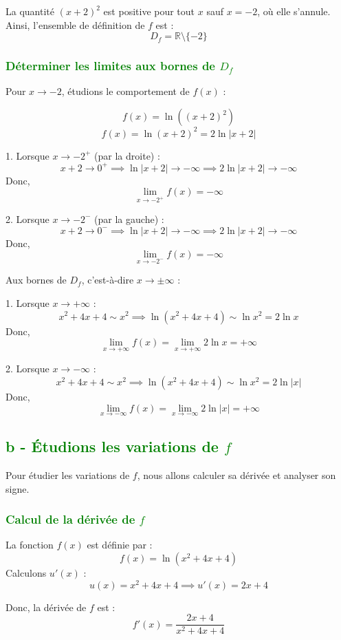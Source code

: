 \documentclass[12pt]{article}
\begin{document}
La quantité \((x + 2)^2\) est positive pour tout \( x \) sauf \( x = -2 \), où elle s'annule. Ainsi, l'ensemble de définition de \( f \) est :
\[
D_f = \mathbb{R} \setminus \{-2\}
\]

\subsubsection*{\textcolor{green}{Déterminer les limites aux bornes de \( D_f \)}}
Pour \( x \to -2 \), étudions le comportement de \( f(x) \) :

\[
f(x) = \ln((x + 2)^2)
\]
\[
f(x) = \ln(x + 2)^2 = 2 \ln|x + 2|
\]

1. Lorsque \( x \to -2^+ \) (par la droite) :
\[
x + 2 \to 0^+ \implies \ln|x + 2| \to -\infty \implies 2 \ln|x + 2| \to -\infty
\]
Donc,
\[
\lim_{x \to -2^+} f(x) = -\infty
\]

2. Lorsque \( x \to -2^- \) (par la gauche) :
\[
x + 2 \to 0^- \implies \ln|x + 2| \to -\infty \implies 2 \ln|x + 2| \to -\infty
\]
Donc,
\[
\lim_{x \to -2^-} f(x) = -\infty
\]

Aux bornes de \( D_f \), c'est-à-dire \( x \to \pm \infty \) :

1. Lorsque \( x \to +\infty \) :
\[
x^2 + 4x + 4 \sim x^2 \implies \ln(x^2 + 4x + 4) \sim \ln x^2 = 2 \ln x
\]
Donc,
\[
\lim_{x \to +\infty} f(x) = \lim_{x \to +\infty} 2 \ln x = +\infty
\]

2. Lorsque \( x \to -\infty \) :
\[
x^2 + 4x + 4 \sim x^2 \implies \ln(x^2 + 4x + 4) \sim \ln x^2 = 2 \ln |x|
\]
Donc,
\[
\lim_{x \to -\infty} f(x) = \lim_{x \to -\infty} 2 \ln |x| = +\infty
\]

\subsection*{\textcolor{green}{b - Étudions les variations de \( f \)}}

Pour étudier les variations de \( f \), nous allons calculer sa dérivée et analyser son signe.

\subsubsection*{\textcolor{green}{Calcul de la dérivée de \( f \)}}
La fonction \( f(x) \) est définie par :
\[
f(x) = \ln(x^2 + 4x + 4)
\]
Calculons \( u'(x) \) :
\[
u(x) = x^2 + 4x + 4 \implies u'(x) = 2x + 4
\]

Donc, la dérivée de \( f \) est :
\[
f'(x) = \frac{2x + 4}{x^2 + 4x + 4}
\]
\end{document}
